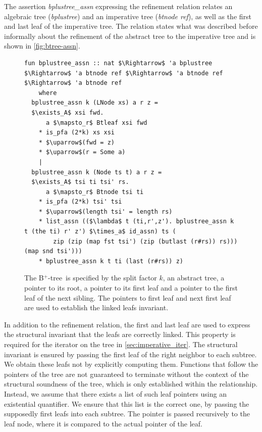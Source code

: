 \documentclass[a4paper,UKenglish,cleveref, autoref, thm-restate]{lipics-v2021}
\newcommand{\btree}{B$^+$-tree}
\begin{document}
The assertion \emph{bplustree\_assn} expressing the refinement relation
 relates an algebraic tree (\emph{bplustree})
and an imperative tree (\emph{btnode ref}), as well as the first and last leaf of the imperative tree.
The relation states what was described before informally
about the refinement of the abstract tree to the imperative tree
and is shown in \autoref{fig:btree-assn}.

\begin{figure}
   \centering 
\begin{lstlisting}[mathescape=true, language=Isabelle,label=lst:btree-relation]
fun bplustree_assn :: nat $\Rightarrow$ 'a bplustree $\Rightarrow$ 'a btnode ref $\Rightarrow$ 'a btnode ref $\Rightarrow$ 'a btnode ref
    where
  bplustree_assn k (LNode xs) a r z =
  $\exists_A$ xsi fwd.
      a $\mapsto_r$ Btleaf xsi fwd
    * is_pfa (2*k) xs xsi
    * $\uparrow$(fwd = z)
    * $\uparrow$(r = Some a)
    |
  bplustree_assn k (Node ts t) a r z =
  $\exists_A$ tsi ti tsi' rs.
      a $\mapsto_r$ Btnode tsi ti
    * is_pfa (2*k) tsi' tsi
    * $\uparrow$(length tsi' = length rs)
    * list_assn (($\lambda$ t (ti,r',z'). bplustree_assn k t (the ti) r' z') $\times_a$ id_assn) ts (
        zip (zip (map fst tsi') (zip (butlast (r#rs)) rs))) (map snd tsi')))
    * bplustree_assn k t ti (last (r#rs)) z)
\end{lstlisting}
    \caption[Assertion describing the imperative \btree]{
        The \btree\ is specified by the split factor $k$, an abstract tree,
        a pointer to its root, a pointer to its first leaf and a pointer
        to the first leaf of the next sibling.
        The pointers to first leaf and next first leaf are used
        to establish the linked leafs invariant.
    }
    \label{fig:btree-assn}
\end{figure}

In addition to the refinement relation,
the first and last leaf are used to express the structural invariant
that the leafs are correctly linked.
This property is required for the iterator on the tree in \autoref{sec:imperative_iter}.
The structural invariant is ensured
by passing the first leaf of the right neighbor to each subtree.
We obtain these leafs not by explicitly computing them.
Functions that follow the pointers of the tree are not guaranteed
to terminate without the context of the structural soundness of the tree,
which is only established within the relationship.
Instead, we assume that there exists a list of such leaf pointers using an existential quantifier.
We ensure that this list is the correct one, by passing the supposedly
first leafs into each subtree.
The pointer is passed recursively to the leaf node,
where it is compared to the actual pointer of the leaf.
\end{document}
